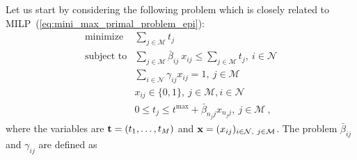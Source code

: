 \documentclass[journal, 10pt, twocolumn]{IEEEtran}
\renewcommand{\vec}[1]{\bf{#1}}     \newcommand{\vecsc}[1]{\mbox {\boldmath \scriptsize $#1$}}     \newcommand{\itvec}[1]{\mbox {\boldmath $#1$}}
\begin{document}
Let us start by considering the following problem which is closely related to MILP~(\ref{eq:mini_max_primal_problem_epi}):
\begin{equation} \label{eq:mini_max_primal_problem_epi-s_equi}
\begin{array}{ll}
\mbox{minimize} & \sum_{j\in\mathcal{M}}t_j \\
\mbox{subject to} & \sum_{j \in \mathcal{M}} \bar{\beta}_{ij}\ x_{ij} \leq \sum_{j\in\mathcal{M}}t_j, \ i\in\mathcal{N} \\
& \sum_{i \in \mathcal{N}}\gamma_{ij} x_{ij}=1, \   j\in\mathcal{M} \\
&  x_{ij}\in\{0,1\}, \ j\in\mathcal{M}, i\in\mathcal{N} \\
&  0\leq t_{j}\leq t^{\mathrm{max}}+\bar{\beta}_{n_jj}x_{n_jj}, \ j\in\mathcal{M} \ ,
\end{array}
\end{equation}
where the variables are ${\vec t}=(t_1,\ldots,t_M)$ and ${\vec x}=(x_{ij})_{i\in\mathcal{N}, \ j\in\mathcal{M}}$. The problem $\bar{\beta}_{ij}$ and $\gamma_{ij}$ are defined as
\end{document}
